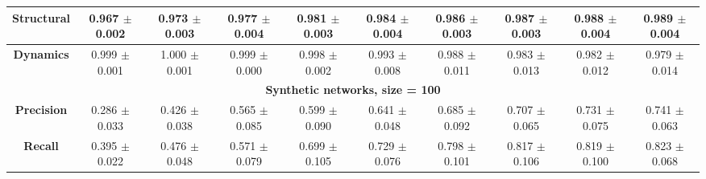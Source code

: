 \begin{table}[h!]
\begin{tabular}{|c|ccccccccc|}
\hline
\textbf{Structural} & 
\makecell{0.967 \\ $\pm$0.002} & \makecell{0.973 \\ $\pm$0.003} & \makecell{0.977 \\ $\pm$0.004} & \makecell{0.981 \\ $\pm$0.003} & 
\makecell{0.984 \\ $\pm$0.004} & \makecell{0.986 \\ $\pm$0.003} & \makecell{0.987 \\ $\pm$0.003} & \makecell{0.988 \\ $\pm$0.004} & \makecell{0.989 \\ $\pm$0.004} \\
\hline
\textbf{Dynamics} & 
\makecell{0.999 \\ $\pm$0.001} & \makecell{1.000 \\ $\pm$0.001} & \makecell{0.999 \\ $\pm$0.000} & \makecell{0.998 \\ $\pm$0.002} & 
\makecell{0.993 \\ $\pm$0.008} & \makecell{0.988 \\ $\pm$0.011} & \makecell{0.983 \\ $\pm$0.013} & \makecell{0.982 \\ $\pm$0.012} & \makecell{0.979 \\ $\pm$0.014} \\
\hline
\multicolumn{10}{|c|}{\textbf{Synthetic networks, size = 100}} \\
\hline
\textbf{Precision} & \makecell{0.286\\$\pm$0.033} & \makecell{0.426\\$\pm$0.038} & \makecell{0.565\\$\pm$0.085} & \makecell{0.599\\$\pm$0.090} & \makecell{0.641\\$\pm$0.048} & \makecell{0.685\\$\pm$0.092} & \makecell{0.707\\$\pm$0.065} & \makecell{0.731\\$\pm$0.075} & \makecell{0.741\\$\pm$0.063} \\
\textbf{Recall} & \makecell{0.395\\$\pm$0.022} & \makecell{0.476\\$\pm$0.048} & \makecell{0.571\\$\pm$0.079} & \makecell{0.699\\$\pm$0.105} & \makecell{0.729\\$\pm$0.076} & \makecell{0.798\\$\pm$0.101} & \makecell{0.817\\$\pm$0.106} & \makecell{0.819\\$\pm$0.100} & \makecell{0.823\\$\pm$0.068} \\

\end{tabular}
\end{table}
